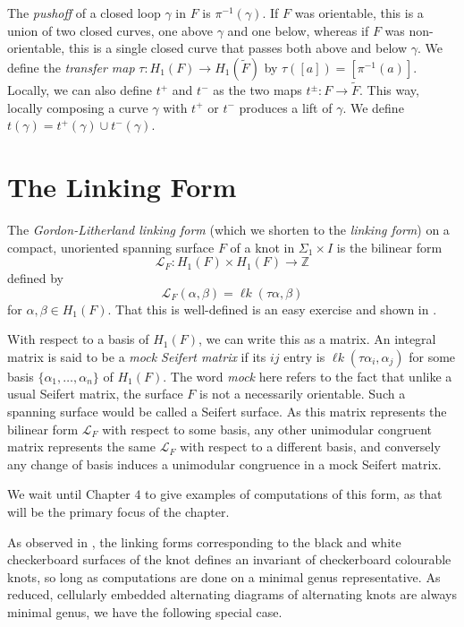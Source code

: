 \documentclass[12pt]{report}
\newcommand{\Z}{\mathbb{Z}}
\newcommand{\lk}{\operatorname{\ell\textit{k}}}
\theoremstyle{upright}
\begin{document}
The \textit{pushoff} of a closed loop $\gamma$ in $F$ is $\pi^{-1}(\gamma)$. If $F$ was orientable, this is a union of two closed curves, one above $\gamma$ and one below, whereas if $F$ was non-orientable, this is a single closed curve that passes both above and below $\gamma$. We define the \textit{transfer map} $\tau: H_{1}(F) \longrightarrow H_{1}(\widetilde{F})$ by $\tau([a]) = [\pi^{-1}(a)]$. Locally, we can also define $t^{+}$ and $t^{-}$ as the two maps $t^{\pm}: F \longrightarrow \widetilde{F}$. This way, locally composing a curve $\gamma$ with $t^{+}$ or $t^{-}$ produces a lift of $\gamma$. We define $t(\gamma) = t^{+}(\gamma) \cup t^{-}(\gamma)$.

\section{The Linking Form}
The \textit{Gordon-Litherland linking form} (which we shorten to the \textit{linking form}) on a compact, unoriented spanning surface $F$ of a knot in $\Sigma_{1} \times I$ is the bilinear form
\[\mathcal{L}_{F}: H_{1}(F) \times H_{1}(F) \longrightarrow \Z\]
defined by
\[\mathcal{L}_{F}(\alpha, \beta) = \lk(\tau\alpha, \beta)\]
for $\alpha, \beta \in H_{1}(F)$. That this is well-defined is an easy exercise and shown in \cite[Chapter 2]{alternating-links-thickened-surfaces}. 

With respect to a basis of $H_{1}(F)$, we can write this as a matrix. An integral matrix is said to be a \textit{mock Seifert matrix} if its $ij$ entry is $\lk(\tau \alpha_{i}, \alpha_{j})$ for some basis $\{\alpha_{1}, \dots, \alpha_{n}\}$ of $H_{1}(F)$. The word \textit{mock} here refers to the fact that unlike a usual Seifert matrix, the surface $F$ is not a necessarily orientable. Such a spanning surface would be called a Seifert surface. As this matrix represents the bilinear form $\mathcal{L}_{F}$ with respect to some basis, any other unimodular congruent matrix represents the same $\mathcal{L}_{F}$ with respect to a different basis, and conversely any change of basis induces a unimodular congruence in a mock Seifert matrix.

We wait until Chapter $4$ to give examples of computations of this form, as that will be the primary focus of the chapter.

As observed in \cite[Section 3]{gordon-litherland-pairing-thickened-surfaces}, the linking forms corresponding to the black and white checkerboard surfaces of the knot defines an invariant of checkerboard colourable knots, so long as computations are done on a minimal genus representative. As reduced, cellularly embedded alternating diagrams of alternating knots are always minimal genus, we have the following special case.
\end{document}
